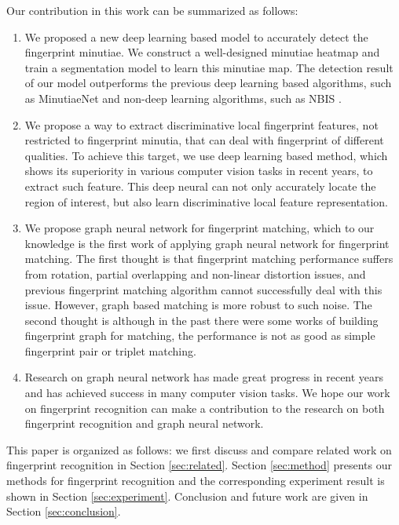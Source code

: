 Our contribution in this work can be summarized as follows:

\begin{enumerate}
    \item We proposed a new deep learning based model to accurately detect the fingerprint minutiae. We construct a well-designed minutiae heatmap and train a segmentation model to learn this minutiae map. The detection result of our model outperforms the previous deep learning based algorithms, such as MinutiaeNet \cite{NguyenICB2018} and non-deep learning algorithms, such as NBIS \cite{NBIS}.
    \item We propose a way to extract discriminative local fingerprint features, not restricted to fingerprint minutia, that can deal with fingerprint of different qualities. To achieve this target, we use deep learning based method, which shows its superiority in various computer vision tasks in recent years, to extract such feature. This deep neural can not only accurately locate the region of interest, but also learn discriminative local feature representation. 
    \item We propose graph neural network for fingerprint matching, which to our knowledge is the first work of applying graph neural network for fingerprint matching. The first thought is that fingerprint matching performance suffers from rotation, partial overlapping and non-linear distortion issues, and previous fingerprint matching algorithm cannot successfully deal with this issue. However, graph based matching is more robust to such noise. The second thought is although in the past there were some works of building fingerprint graph for matching, the performance is not as good as simple fingerprint pair or triplet matching.
    \item Research on graph neural network has made great progress in recent years and has achieved success in many computer vision tasks. We hope our work on fingerprint recognition can make a contribution to the research on both fingerprint recognition and graph neural network.
\end{enumerate}

This paper is organized as follows: we first discuss and compare related work on fingerprint recognition in Section \ref{sec:related}. Section \ref{sec:method} presents our methods for fingerprint recognition and the corresponding experiment result is shown in Section \ref{sec:experiment}. Conclusion and future work are given in Section \ref{sec:conclusion}.